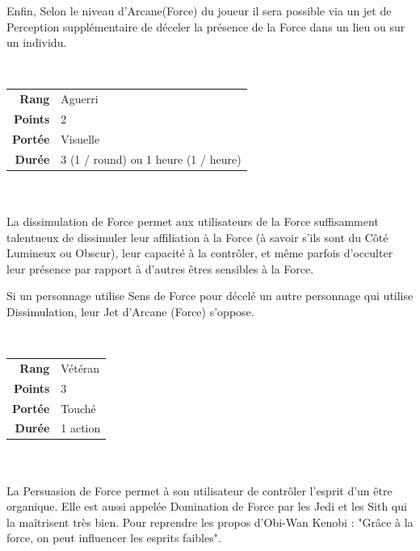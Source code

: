 \begin{description}[align=left]
        Enfin, Selon le niveau d'Arcane(Force) du joueur il sera possible via un jet de Perception supplémentaire de déceler la présence de la Force dans un lieu ou sur un individu.
        \\	

    \item [Dissimulation de Force] ~ \\

        \begin{tabular}{ r l }
            \textbf{Rang}    & Aguerri \\
            \textbf{Points}  & 2 \\
            \textbf{Portée}  & Visuelle \\
            \textbf{Durée}   & 3 (1 / round) ou 1 heure (1 / heure) \\
        \end{tabular}
        \\ \\
		La dissimulation de Force permet aux utilisateurs de la Force suffisamment talentueux de dissimuler leur affiliation à la Force (à savoir s'ils sont du Côté Lumineux ou Obscur), leur capacité à la contrôler, et même parfois d'occulter leur présence par rapport à d'autres êtres sensibles à la Force. 

		Si un personnage utilise Sens de Force pour décelé un autre personnage qui utilise Dissimulation, leur Jet d'Arcane (Force) s'oppose.
        \\

	\item [Persuasion de Force] ~ \\

        \begin{tabular}{ r l }
            \textbf{Rang}    & Vétéran \\
            \textbf{Points}  & 3 \\
            \textbf{Portée}  & Touché \\
            \textbf{Durée}   & 1 action \\
        \end{tabular}
        \\ \\
		La Persuasion de Force permet à son utilisateur de contrôler l'esprit d'un être organique. Elle est aussi appelée Domination de Force par les Jedi et les Sith qui la maîtrisent très bien. Pour reprendre les propos d'Obi-Wan Kenobi : "Grâce à la force, on peut influencer les esprits faibles". 


\end{description}
